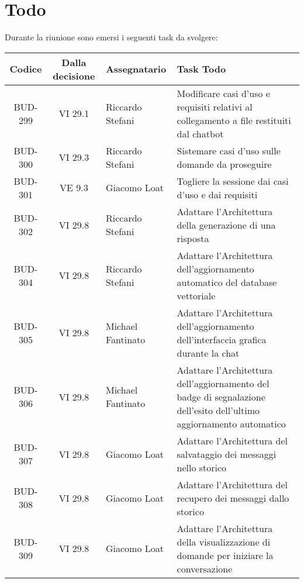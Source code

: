 
\section{Todo}

Durante la riunione sono emersi i seguenti task da svolgere:

\vspace{0.5cm}

\begin{table}[htbp]
\centering
{}
\begin{tabular}{|c|c|p{}|p{}|}
    \hline
    \rowcolor[gray]{0.75}
    \textbf{Codice} & \textbf{Dalla decisione} & \textbf{Assegnatario} & \textbf{Task Todo} \\
    \hline
    BUD-299 & VI 29.1 & Riccardo Stefani & Modificare casi d'uso e requisiti relativi al collegamento a file restituiti dal chatbot\\
    \hline
    BUD-300 & VI 29.3 & Riccardo Stefani & Sistemare casi d'uso sulle domande da proseguire\\
    \hline
    BUD-301 & VE 9.3 & Giacomo Loat & Togliere la sessione dai casi d'uso e dai requisiti\\
    \hline
    BUD-302 & VI 29.8 & Riccardo Stefani & Adattare l'Architettura della generazione di una risposta\\
    \hline
    BUD-304 & VI 29.8 & Riccardo Stefani & Adattare l'Architettura dell’aggiornamento automatico del database vettoriale\\
    \hline
    BUD-305 & VI 29.8 & Michael Fantinato & Adattare l'Architettura dell’aggiornamento dell’interfaccia grafica durante la chat \\
    \hline
    BUD-306 & VI 29.8 & Michael Fantinato & Adattare l'Architettura dell’aggiornamento del badge di segnalazione dell’esito dell’ultimo aggiornamento automatico\\
    \hline
    BUD-307 & VI 29.8 & Giacomo Loat & Adattare l'Architettura del salvataggio dei messaggi nello storico\\
    \hline
    BUD-308 & VI 29.8 & Giacomo Loat & Adattare l'Architettura del recupero dei messaggi dallo storico\\
    \hline
    BUD-309 & VI 29.8 & Giacomo Loat & Adattare l'Architettura della visualizzazione di domande per iniziare la conversazione\\

\end{tabular}
\end{table}
